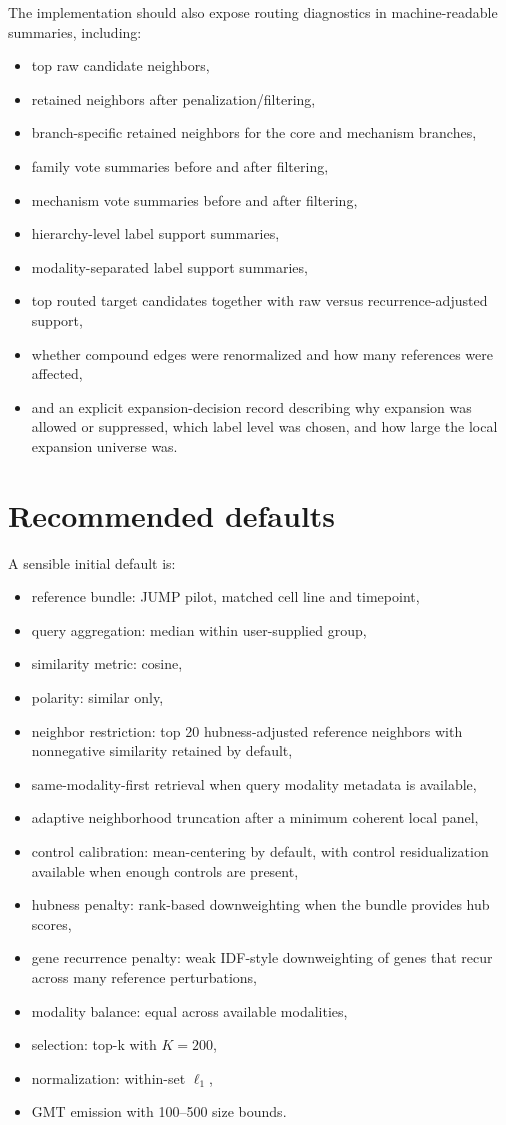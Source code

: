 \documentclass[11pt]{article}
\begin{document}
The implementation should also expose routing diagnostics in machine-readable summaries, including:
\begin{itemize}[leftmargin=2em]
\item top raw candidate neighbors,
\item retained neighbors after penalization/filtering,
\item branch-specific retained neighbors for the core and mechanism branches,
\item family vote summaries before and after filtering,
\item mechanism vote summaries before and after filtering,
\item hierarchy-level label support summaries,
\item modality-separated label support summaries,
\item top routed target candidates together with raw versus recurrence-adjusted support,
\item whether compound edges were renormalized and how many references were affected,
\item and an explicit expansion-decision record describing why expansion was allowed or suppressed, which label level was chosen, and how large the local expansion universe was.
\end{itemize}

\section{Recommended defaults}
A sensible initial default is:
\begin{itemize}[leftmargin=2em]
\item reference bundle: JUMP pilot, matched cell line and timepoint,
\item query aggregation: median within user-supplied group,
\item similarity metric: cosine,
\item polarity: similar only,
\item neighbor restriction: top 20 hubness-adjusted reference neighbors with nonnegative similarity retained by default,
\item same-modality-first retrieval when query modality metadata is available,
\item adaptive neighborhood truncation after a minimum coherent local panel,
\item control calibration: mean-centering by default, with control residualization available when enough controls are present,
\item hubness penalty: rank-based downweighting when the bundle provides hub scores,
\item gene recurrence penalty: weak IDF-style downweighting of genes that recur across many reference perturbations,
\item modality balance: equal across available modalities,
\item selection: top-k with $K=200$,
\item normalization: within-set $\ell_1$,
\item GMT emission with 100--500 size bounds.
\end{itemize}
\end{document}
